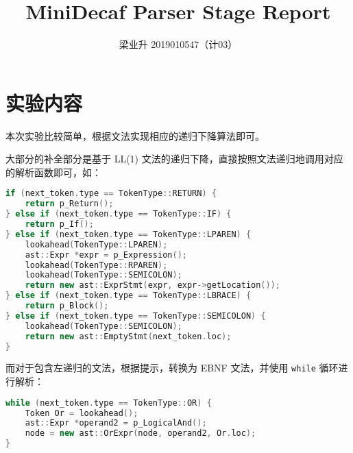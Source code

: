 \documentclass[a4paper]{article}
\author{梁业升 2019010547（计03）}
\begin{document}




\title{MiniDecaf Parser Stage Report}

\maketitle

\section{实验内容}

本次实验比较简单，根据文法实现相应的递归下降算法即可。

大部分的补全部分是基于 LL(1) 文法的递归下降，直接按照文法递归地调用对应的解析函数即可，如：

\begin{lstlisting}[language=c++]
if (next_token.type == TokenType::RETURN) {
    return p_Return();
} else if (next_token.type == TokenType::IF) {
    return p_If();
} else if (next_token.type == TokenType::LPAREN) {
    lookahead(TokenType::LPAREN);
    ast::Expr *expr = p_Expression();
    lookahead(TokenType::RPAREN);
    lookahead(TokenType::SEMICOLON);
    return new ast::ExprStmt(expr, expr->getLocation());
} else if (next_token.type == TokenType::LBRACE) {
    return p_Block();
} else if (next_token.type == TokenType::SEMICOLON) {
    lookahead(TokenType::SEMICOLON);
    return new ast::EmptyStmt(next_token.loc);
}
\end{lstlisting}

而对于包含左递归的文法，根据提示，转换为 EBNF 文法，并使用 \texttt{while} 循环进行解析：

\begin{lstlisting}[language=c++]
while (next_token.type == TokenType::OR) {
    Token Or = lookahead();
    ast::Expr *operand2 = p_LogicalAnd();
    node = new ast::OrExpr(node, operand2, Or.loc);
}
\end{lstlisting}
\end{document}
